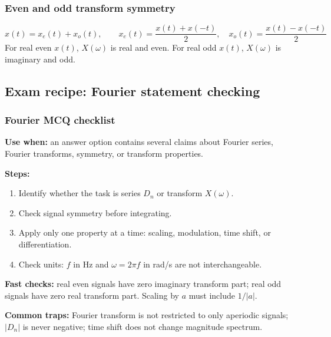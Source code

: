 \subsubsection{Even and odd transform symmetry}
\[
x(t)=x_e(t)+x_o(t),\qquad
x_e(t)=\frac{x(t)+x(-t)}{2},\quad x_o(t)=\frac{x(t)-x(-t)}{2}
\]
For real even \(x(t)\), \(X(\omega)\) is real and even. For real odd \(x(t)\), \(X(\omega)\) is imaginary and odd.

\subsection{Exam recipe: Fourier statement checking}

\subsubsection{Fourier MCQ checklist}
\textbf{Use when:} an answer option contains several claims about Fourier series, Fourier transforms, symmetry, or transform properties.

\textbf{Steps:}
\begin{enumerate}
    \item Identify whether the task is series \(D_n\) or transform \(X(\omega)\).
    \item Check signal symmetry before integrating.
    \item Apply only one property at a time: scaling, modulation, time shift, or differentiation.
    \item Check units: \(f\) in Hz and \(\omega=2\pi f\) in rad/s are not interchangeable.
\end{enumerate}

\textbf{Fast checks:} real even signals have zero imaginary transform part; real odd signals have zero real transform part. Scaling by \(a\) must include \(1/|a|\).

\textbf{Common traps:} Fourier transform is not restricted to only aperiodic signals; \(|D_n|\) is never negative; time shift does not change magnitude spectrum.

